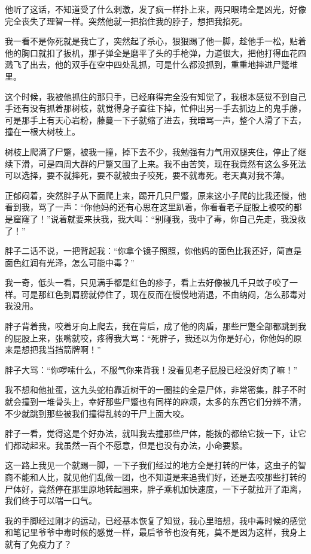 他听了这话，不知道受了什么刺激，发了疯一样扑上来，两只眼睛全是凶光，好像完全丧失了理智一样。突然他就一把掐住我的脖子，想把我掐死。

我一看不是你死就是我亡了，突然起了杀心，狠狠踢了他一脚，趁他手一松，贴着他的胸口就扣了扳机，那子弹全是磨平了头的手枪弹，力道很大，把他打得血花四溅飞了出去，他的双手在空中四处乱抓，可是什么都没抓到，重重地摔进尸蹩堆里。

这个时候，我被他抓住的那只手，已经麻得完全没有知觉了，我根本感觉不到自己手还有没有抓着那树枝，就觉得身子直往下掉，忙伸出另一手去抓边上的鬼手藤，可是那手上有天心岩粉，藤蔓一下子就缩了进去，我暗骂一声，整个人滑了下去，撞在一根大树枝上。

树枝上爬满了尸蹩，被我一撞，掉下去不少，我勉强有力气用双腿夹住，停止了继续下滑，可是四周大群的尸蹩又围了上来。我不由苦笑，现在我竟然有这么多死法可以选择，要不就摔死，要不就被虫子咬死，要不就毒死。老天真对我不薄。

正郁闷着，突然胖子从下面爬上来，踢开几只尸蹩，原来这小子爬的比我还慢，他看到我，骂了一声：“你他妈的还有心思在这里趴着，你看看老子屁股上被咬的都是窟窿了！”说着就要来扶我，我大叫：“别碰我，我中了毒，你自己先走，我没救了！”

胖子二话不说，一把背起我：“你拿个镜子照照，你他妈的面色比我还好，简直是面色红润有光泽，怎么可能中毒？”

我一奇，低头一看，只见满手都是红色的疹子，看上去好像被几千只蚊子咬了一样。可是那红色到肩膀就停住了，现在反而在慢慢地消退，不由纳闷，怎么那毒对我没用。

胖子背着我，咬着牙向上爬去，我在背后，成了他的肉盾，那些尸蹩全部都跳到我的屁股上来，张嘴就咬，疼得我大骂：“死胖子，我还以为你是好心，你他妈的原来是想把我当挡箭牌啊！”

胖子大骂：“你啰嗦什么，不服气你来背我！没看见老子屁股已经没好肉了嘛！”

我不想和他扯蛋，这九头蛇柏靠近树干的一圈挂的全是尸体，非常密集，胖子不时就会撞到一堆骨头上，幸好那些尸蹩也有同样的麻烦，太多的东西它们分辨不清，不少就跳到那些被我们撞得乱转的干尸上面大咬。

胖子一看，觉得这是个好办法，就叫我去撞那些尸体，能拨的都给它拨一下，让它们都动起来。我虽然一百个不愿意，但是也没有办法，小命要紧。

这一路上我见一个就踢一脚，一下子我们经过的地方全是打转的尸体，这虫子的智商不能和人比，就见他们乱做一团，也不知道是来追我们好，还是去咬那些打转的尸体好，竟然停在那里原地转起圈来，胖子乘机加快速度，一下子就拉开了距离，我们终于可以喘一口气。

我的手脚经过刚才的运动，已经基本恢复了知觉，我心里暗想，我中毒时候的感觉和笔记里爷爷中毒时候的感觉一样，最后爷爷也没有死，莫不是因为这样，我身上就有了免疫力了？

